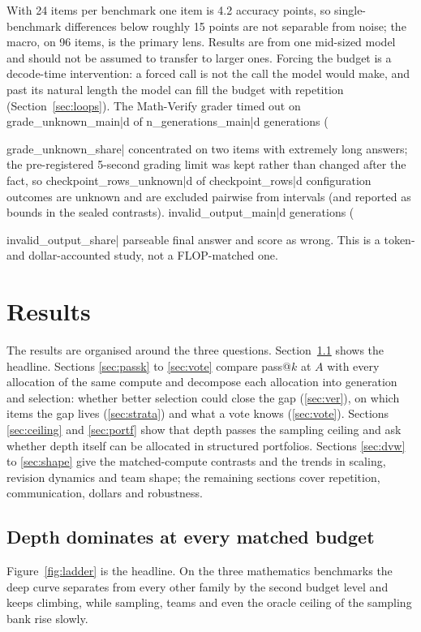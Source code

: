 \documentclass[11pt]{article}
\begin{document}
With 24 items per benchmark one item is 4.2 accuracy points, so single-benchmark differences below
roughly 15 points are not separable from noise; the macro, on 96 items, is the primary lens. Results are
from one mid-sized model and should not be assumed to transfer to larger ones. Forcing the budget is a
decode-time intervention: a forced call is not the call the model would make, and past its natural
length the model can fill the budget with repetition (Section~\ref{sec:loops}). The Math-Verify grader
timed out on {{grade_unknown_main|d}} of {{n_generations_main|d}} generations ({{grade_unknown_share|%
concentrated on two items with extremely long answers; the pre-registered 5-second grading limit was kept
rather than changed after the fact, so {{checkpoint_rows_unknown|d}} of {{checkpoint_rows|d}}
configuration outcomes are unknown and are excluded pairwise from intervals (and reported as bounds in
the sealed contrasts). {{invalid_output_main|d}} generations ({{invalid_output_share|%
parseable final answer and score as wrong. This is a token- and dollar-accounted study, not a FLOP-matched
one.

\section{Results}

The results are organised around the three questions. Section~\ref{sec:dom} shows the headline. Sections
\ref{sec:passk} to \ref{sec:vote} compare pass@$k$ at $A$ with every allocation of the same compute and
decompose each allocation into generation and selection: whether better selection could close the gap
(\ref{sec:ver}), on which items the gap lives (\ref{sec:strata}) and what a vote knows
(\ref{sec:vote}). Sections \ref{sec:ceiling} and \ref{sec:portf} show that depth passes the sampling ceiling
and ask whether depth itself can be allocated in structured portfolios. Sections \ref{sec:dvw} to
\ref{sec:shape} give the matched-compute contrasts and the trends in scaling, revision dynamics and team
shape; the remaining sections cover repetition, communication, dollars and robustness.

\subsection{Depth dominates at every matched budget}
\label{sec:dom}

Figure~\ref{fig:ladder} is the headline. On the three mathematics benchmarks the deep curve separates from
every other family by the second budget level and keeps climbing, while sampling, teams and even the
oracle ceiling of the sampling bank rise slowly.

}}}}
\end{document}
